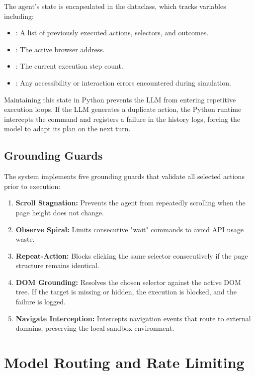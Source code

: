The agent's state is encapsulated in the  dataclass, which tracks variables including:
\begin{itemize}
    \item {}: A list of previously executed actions, selectors, and outcomes.
    \item {}: The active browser address.
    \item {}: The current execution step count.
    \item {}: Any accessibility or interaction errors encountered during simulation.
\end{itemize}

Maintaining this state in Python prevents the LLM from entering repetitive execution loops. If the LLM generates a duplicate action, the Python runtime intercepts the command and registers a failure in the history logs, forcing the model to adapt its plan on the next turn.

\subsection{Grounding Guards}
\label{sec:guards-logic}

The system implements five grounding guards that validate all selected actions prior to execution:
\begin{enumerate}
    \item \textbf{Scroll Stagnation:} Prevents the agent from repeatedly scrolling when the page height does not change.
    \item \textbf{Observe Spiral:} Limits consecutive "wait" commands to avoid API usage waste.
    \item \textbf{Repeat-Action:} Blocks clicking the same selector consecutively if the page structure remains identical.
    \item \textbf{DOM Grounding:} Resolves the chosen selector against the active DOM tree. If the target is missing or hidden, the execution is blocked, and the failure is logged.
    \item \textbf{Navigate Interception:} Intercepts navigation events that route to external domains, preserving the local sandbox environment.
\end{enumerate}


\section{Model Routing and Rate Limiting}
\label{sec:model-routing}

